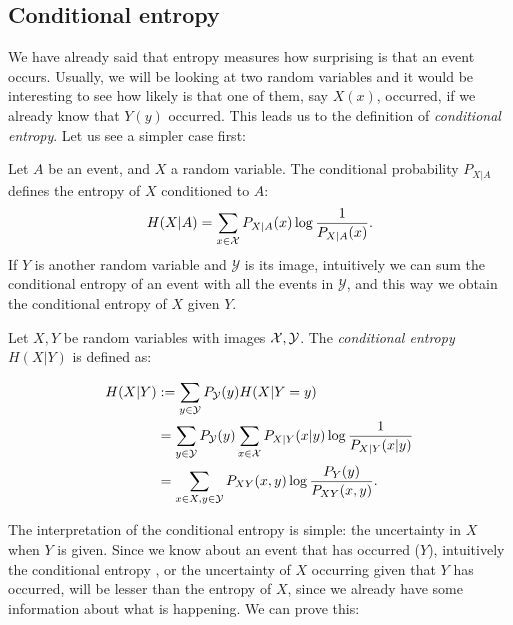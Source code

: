 \subsection*{Conditional entropy}
We have already said that entropy measures how surprising is that an event occurs.
Usually, we will be looking at two random variables and it would be interesting to see how likely is that one of them, say $X(x)$, occurred, if we already know that $Y(y)$ occurred. 
This leads us to the definition of \emph{conditional entropy}. Let us see a simpler case first:

Let $A$ be an event, and $X$ a random variable. The conditional probability $P_{X|A}$ defines the entropy of $X$ conditioned to $ A$:
$$
H(X| A) = \sum_{x \in \mathcal{X}} P_{X|A}(x) \log\frac{1}{P_{X|A}(x)}.
$$
If $Y$ is another random variable and $\mathcal Y$ is its image, intuitively we can sum the conditional entropy of an event with all the events in $\mathcal Y$, and this way we obtain the conditional entropy of $X$ given $Y$.
\begin{ndef}
Let $X,Y$ be random variables with images $\mathcal{X},\mathcal Y$. The \emph{conditional entropy} $H(X | Y)$ is defined as:

\begin{equation*}
    \begin{split}
    H(X|Y) &  :=   \sum_{y \in \mathcal Y} P_{\mathcal Y}(y) H(X| Y = y)  \\ 
    & = \sum_{y \in \mathcal Y} P_{\mathcal  Y}(y) \sum_{x \in \mathcal{X}} P_{X | Y}(x|y)\log\frac{1}{P_{X|Y}(x|y)}  \\
   & = \sum_{x \in X,y \in \mathcal Y}P_{XY}(x,y)\log\frac{P_Y(y)}{P_{XY}(x,y)}.
\end{split}
\end{equation*}
\end{ndef}

The interpretation of the conditional entropy is simple: the uncertainty in $X$ when $Y$ is given.
Since we know about an event that has occurred ($Y$), intuitively the conditional entropy , or the uncertainty of $X$ occurring given that $Y$ has occurred, will be lesser than the entropy of $X$, since we already have some information about what is happening. We can prove this:

